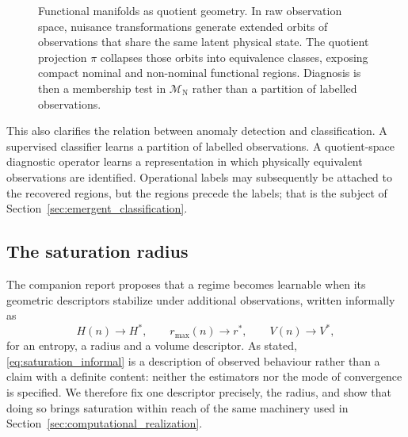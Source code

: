 \documentclass[a4paper]{cas-sc}
\newcommand{\Mnominal}{\ensuremath{\mathcal{M}_{\mathrm{N}}}}
\begin{document}
\begin{figure}[htbp]
\caption{Functional manifolds as quotient geometry. In raw observation space,
nuisance transformations generate extended orbits of observations that share
the same latent physical state. The quotient projection \(\pi\) collapses
those orbits into equivalence classes, exposing compact nominal and
non-nominal functional regions. Diagnosis is then a membership test in
\(\Mnominal\) rather than a partition of labelled observations.}
\label{fig:quotient_manifold_concept}
\end{figure}

This also clarifies the relation between anomaly detection and
classification. A supervised classifier learns a partition of labelled
observations. A quotient-space diagnostic operator learns a representation in
which physically equivalent observations are identified. Operational labels
may subsequently be attached to the recovered regions, but the regions precede
the labels; that is the subject of
Section~\ref{sec:emergent_classification}.

\subsection{The saturation radius}
\label{subsec:saturation_radius}

The companion report \citep{disanti2026inverse} proposes that a regime becomes
learnable when its geometric descriptors stabilize under additional
observations, written informally as
\begin{equation}
H(n)\to H^*,\qquad
r_{\max}(n)\to r^*,\qquad
V(n)\to V^*,
\label{eq:saturation_informal}
\end{equation}
for an entropy, a radius and a volume descriptor. As stated,
\eqref{eq:saturation_informal} is a description of observed behaviour rather
than a claim with a definite content: neither the estimators nor the mode of
convergence is specified. We therefore fix one descriptor precisely, the
radius, and show that doing so brings saturation within reach of the same
machinery used in Section~\ref{sec:computational_realization}.
\end{document}
